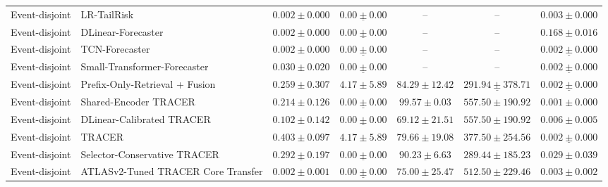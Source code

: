 \begin{table}[t]
{\begin{tabular}{llccccc}
\midrule
Event-disjoint & LR-TailRisk & $0.002 \pm 0.000$ & $\underline{0.00 \pm 0.00}$ & -- & -- & $0.003 \pm 0.000$ \\
Event-disjoint & DLinear-Forecaster & $0.002 \pm 0.000$ & $\underline{0.00 \pm 0.00}$ & -- & -- & $0.168 \pm 0.016$ \\
Event-disjoint & TCN-Forecaster & $0.002 \pm 0.000$ & $\underline{0.00 \pm 0.00}$ & -- & -- & $\underline{0.002 \pm 0.000}$ \\
Event-disjoint & Small-Transformer-Forecaster & $0.030 \pm 0.020$ & $\underline{0.00 \pm 0.00}$ & -- & -- & $\underline{0.002 \pm 0.000}$ \\
Event-disjoint & Prefix-Only-Retrieval + Fusion & $0.259 \pm 0.307$ & $\mathbf{4.17 \pm 5.89}$ & $84.29 \pm 12.42$ & $\underline{291.94 \pm 378.71}$ & $\underline{0.002 \pm 0.000}$ \\
Event-disjoint & Shared-Encoder TRACER & $0.214 \pm 0.126$ & $\underline{0.00 \pm 0.00}$ & $\mathbf{99.57 \pm 0.03}$ & $557.50 \pm 190.92$ & $\mathbf{0.001 \pm 0.000}$ \\
Event-disjoint & DLinear-Calibrated TRACER & $0.102 \pm 0.142$ & $\underline{0.00 \pm 0.00}$ & $69.12 \pm 21.51$ & $557.50 \pm 190.92$ & $0.006 \pm 0.005$ \\
Event-disjoint & TRACER & $\mathbf{0.403 \pm 0.097}$ & $\mathbf{4.17 \pm 5.89}$ & $79.66 \pm 19.08$ & $377.50 \pm 254.56$ & $\underline{0.002 \pm 0.000}$ \\
Event-disjoint & Selector-Conservative TRACER & $\underline{0.292 \pm 0.197}$ & $\underline{0.00 \pm 0.00}$ & $\underline{90.23 \pm 6.63}$ & $\mathbf{289.44 \pm 185.23}$ & $0.029 \pm 0.039$ \\
Event-disjoint & ATLASv2-Tuned TRACER Core Transfer & $0.002 \pm 0.001$ & $\underline{0.00 \pm 0.00}$ & $75.00 \pm 25.47$ & $512.50 \pm 229.46$ & $0.003 \pm 0.002$ \\
\bottomrule
\end{tabular}
}
\end{table}

